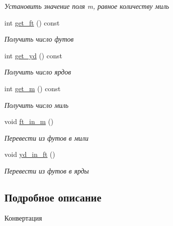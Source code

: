 \begin{DoxyCompactItemize}
\begin{DoxyCompactList}\small\item\em Установить значение поля m, равное количеству миль \end{DoxyCompactList}\item 
int \hyperlink{classimperial__system_ace37e54b90e00466e67fb7c91d4952a7}{get\+\_\+ft} () const 
\begin{DoxyCompactList}\small\item\em Получить число футов \end{DoxyCompactList}\item 
int \hyperlink{classimperial__system_ab65fad68a8c5f9b1ad533f188d2c7c6d}{get\+\_\+yd} () const 
\begin{DoxyCompactList}\small\item\em Получить число ярдов \end{DoxyCompactList}\item 
int \hyperlink{classimperial__system_a4c389821590de00e418f928071d7eaf9}{get\+\_\+m} () const 
\begin{DoxyCompactList}\small\item\em Получить число миль \end{DoxyCompactList}\item 
\hypertarget{classimperial__system_adfa4c786b486034f2ce397ecc7e4d236}{void \hyperlink{classimperial__system_adfa4c786b486034f2ce397ecc7e4d236}{ft\+\_\+in\+\_\+m} ()}\label{classimperial__system_adfa4c786b486034f2ce397ecc7e4d236}

\begin{DoxyCompactList}\small\item\em Перевести из футов в мили \end{DoxyCompactList}\item 
\hypertarget{classimperial__system_a513389a7607c856bd902f79466fefbfb}{void \hyperlink{classimperial__system_a513389a7607c856bd902f79466fefbfb}{yd\+\_\+in\+\_\+ft} ()}\label{classimperial__system_a513389a7607c856bd902f79466fefbfb}

\begin{DoxyCompactList}\small\item\em Перевести из футов в ярды \end{DoxyCompactList}\end{DoxyCompactItemize}


\subsection{Подробное описание}
Конвертация 


